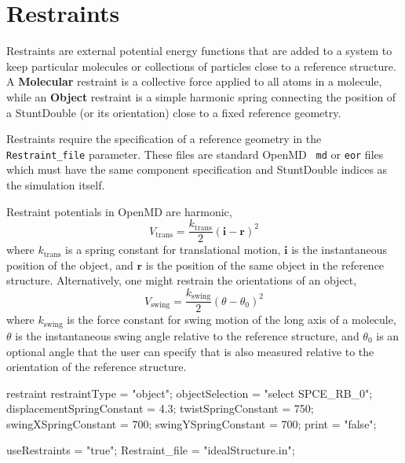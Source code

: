 \documentclass[]{book}
\begin{document}
\chapter{\label{chapter:restraints}Restraints}
Restraints are external potential energy functions that are added to a
system to keep particular molecules or collections of particles close
to a reference structure.  A \textbf{Molecular} restraint is a
collective force applied to all atoms in a molecule, while an
\textbf{Object} restraint is a simple harmonic spring connecting the
position of a StuntDouble (or its orientation) close to a fixed
reference geometry.

Restraints require the specification of a reference geometry in the
{\tt Restraint\_file} parameter.  These files are standard OpenMD {\tt
  md} or {\tt eor} files which must have the same component
specification and StuntDouble indices as the simulation itself.

Restraint potentials in OpenMD are harmonic,
\begin{equation}
V_\mathrm{trans} = \frac{k_\mathrm{trans}}{2} \left( \mathbf{i} - \mathbf{r}
\right)^2
\end{equation}
where $k_\mathrm{trans}$ is a spring constant for translational
motion, $\mathbf{i}$ is the instantaneous position of the object, and
$\mathbf{r}$ is the position of the same object in the reference
structure.  Alternatively, one might restrain the orientations of an object,
\begin{equation}
V_\mathrm{swing} = \frac{k_\mathrm{swing}}{2} \left( \theta - \theta_0 \right)^2
\end{equation}
where $k_\mathrm{swing}$ is the force constant for swing motion of the
long axis of a molecule, $\theta$ is the instantaneous swing angle
relative to the reference structure, and $\theta_0$ is an optional
angle that the user can specify that is also measured relative to the
orientation of the reference structure.

\begin{code}[caption={[Specifying restraints for all objects matching a
    selection] Sample keywords defining object restraints (here the
    object is the first rigid body associated with SPCE molecules},label={sch:restObj}] 
restraint{
  restraintType = "object";
  objectSelection = "select SPCE_RB_0";
  displacementSpringConstant = 4.3;
  twistSpringConstant = 750;
  swingXSpringConstant = 700;
  swingYSpringConstant = 700;
  print = "false";
}

useRestraints = "true";
Restraint_file = "idealStructure.in";
\end{code}
\end{document}
